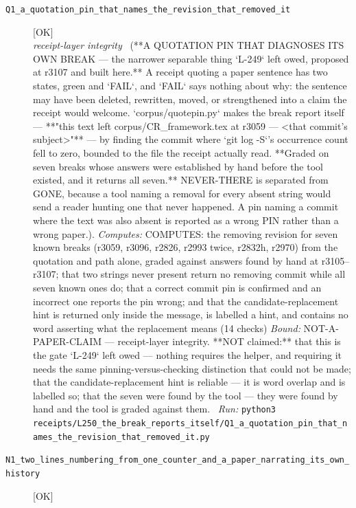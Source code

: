 \begin{description}
\item[\label{rcpt:Q1_a_quotation_pin_that_names_the_revision_that_removed_it}\texttt{Q1\_a\_quotation\_pin\_that\_names\_the\_revision\_that\_removed\_it}]\hfill\textsf{[OK]}\\
\textit{receipt-layer integrity} \ (**A QUOTATION PIN THAT DIAGNOSES ITS OWN BREAK --- the narrower separable thing `L-249` left owed, proposed at r3107 and built here.** A receipt quoting a paper sentence has two states, green and `FAIL`, and `FAIL` says nothing about why: the sentence may have been deleted, rewritten, moved, or strengthened into a claim the receipt would welcome. `corpus/quotepin.py` makes the break report itself --- **"this text left corpus/CR\_framework.tex at r3059 --- <that commit's subject>"** --- by finding the commit where `git log -S`'s occurrence count fell to zero, bounded to the file the receipt actually read. **Graded on seven breaks whose answers were established by hand before the tool existed, and it returns all seven.** NEVER-THERE is separated from GONE, because a tool naming a removal for every absent string would send a reader hunting one that never happened. A pin naming a commit where the text was also absent is reported as a wrong PIN rather than a wrong paper.). 
\emph{Computes:} COMPUTES: the removing revision for seven known breaks (r3059, r3096, r2826, r2993 twice, r2832h, r2970) from the quotation and path alone, graded against answers found by hand at r3105--r3107; that two strings never present return no removing commit while all seven known ones do; that a correct commit pin is confirmed and an incorrect one reports the pin wrong; and that the candidate-replacement hint is returned only inside the message, is labelled a hint, and contains no word asserting what the replacement means (14 checks)
 \emph{Bound:} NOT-A-PAPER-CLAIM --- receipt-layer integrity. **NOT claimed:** that this is the gate `L-249` left owed --- nothing requires the helper, and requiring it needs the same pinning-versus-checking distinction that could not be made; that the candidate-replacement hint is reliable --- it is word overlap and is labelled so; that the seven were found by the tool --- they were found by hand and the tool is graded against them.
\ \emph{Run:} \texttt{python3 receipts/L250\_the\_break\_reports\_itself/Q1\_a\_quotation\_pin\_that\_names\_the\_revision\_that\_removed\_it.py}
\item[\label{rcpt:N1_two_lines_numbering_from_one_counter_and_a_paper_narrating_its_own_history}\texttt{N1\_two\_lines\_numbering\_from\_one\_counter\_and\_a\_paper\_narrating\_its\_own\_history}]\hfill\textsf{[OK]}\\

\end{description}

